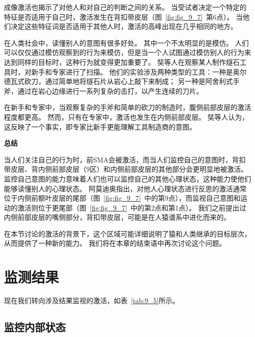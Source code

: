成像激活也揭示了对他人和对自己的判断之间的关系。
当受试者决定一个特定的特征是否适用于自己时，激活发生在背扣带皮层（图~\ref{fig:fig_9_7}~第6点）。
当他们决定这些特征词是否适用于其他人时，激活的高峰出现在几乎相同的地方\cite{ochsner2005neural}。
\par


在人类社会中，读懂别人的意图有很多好处。
其中一个不太明显的是模仿。
人们可以仅仅通过模仿观察到的行为来模仿，但是当一个人试图通过模仿别人的行为来达到同样的目标时，这种行为就变得更加重要了。
奘等人\cite{stout2011technology}在观察某人制作燧石工具时，对新手和专家进行了扫描。
他们的实验涉及两种类型的工具：一种是奥尔德瓦式砍刀，通过简单地将燧石片从岩心上敲下来制成；
另一种是阿舍利式手斧，通过在岩心边缘进行一系列复杂的击打，以产生连续的刀片。
\par


在新手和专家中，当观察复杂的手斧和简单的砍刀的制造时，腹侧前部皮层的激活程度都更高。
然而，只有在专家中，激活也发生在内侧前部皮层。
奘等人认为，这反映了一个事实，即专家比新手更能理解工具制造商的意图。
\par


\textbf{总结}
\par

当人们关注自己的行为时，前SMA会被激活，而当人们监控自己的意图时，背扣带皮层、背内侧前部皮层（9区）和内侧前部皮层的其他部分会更明显地被激活。
监控自己意图的能力意味着人们也可以监控自己的其他心理状态，这种能力使他们能够读懂别人的心理状态。
阿莫迪奥\cite{amodio2006meeting}指出，对他人心理状态进行反思的激活通常位于内侧前额叶皮层的尾部（图~\ref{fig:fig_9_7}~中的第9点），而监视自己意图和运动的激活则位于更尾部（图~\ref{fig:fig_9_7}~中的第2点和第1点）。
我们之前提出过内侧前部皮层的嘴侧部分，背扣带皮层，可能是在人猿谱系中进化而来的。
\par


在本节讨论的激活的背景下，这个区域可能详细说明了猿和人类继承的目标层次，从而提供了一种新的能力。
我们将在本章的结束语中再次讨论这个问题。



\section{监测结果}
\par
现在我们转向涉及结果监视的激活，如表~\ref{tab:9_5}所示。


\subsection{监控内部状态}
\par


